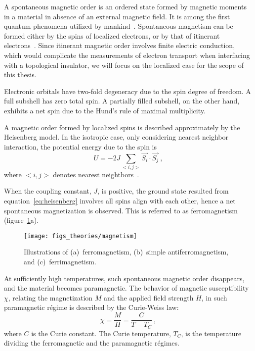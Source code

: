 A spontaneous magnetic order is an ordered state formed by magnetic moments in a material in absence of an external magnetic field. It is among the first quantum phenomena utilized by mankind~\cite{mag_history}. Spontaneous magnetism can be formed either by the spins of localized electrons, or by that of itinerant electrons~\cite{moriya1984}. Since itinerant magnetic order involves finite electric conduction, which would complicate the measurements of electron transport when interfacing with a topological insulator, we will focus on the localized case for the scope of this thesis.

Electronic orbitals have two-fold degeneracy due to the spin degree of freedom. A full subshell has zero total spin. A partially filled subshell, on the other hand, exhibits a net spin due to the Hund's rule of maximal multiplicity.

A magnetic order formed by localized spins is described approximately by the Heisenberg model. In the isotropic case, only considering nearest neighbor interaction, the potential energy due to the spin is%
\begin{equation}%
    U = -2J \sum_{<i, j>} \vec{S_i} \cdot \vec{S_j}~,\label{eq:heisenberg}%
\end{equation}%
where $<i, j>$ denotes nearest neightbors~\cite{kittel}.

When the coupling constant, $J$, is positive, the ground state resulted from equation~\ref{eq:heisenberg} involves all spins align with each other, hence a net spontaneous magnetization is observed. This is referred to as ferromagnetism (figure~\ref{fig:bg_mag}a). %
\begin{figure}[ht]%
    \centering%
    \texttt{[image: figs\_theories/magnetism]}%
    \caption[Illustrations of ferromagnetism, antiferromagnetism, and ferrimagnetism]{\label{fig:bg_mag}Illustrations of (a)~ferromagnetism, (b)~simple antiferromagnetism, and (c)~ferrimagnetism.}%
\end{figure}%
%
At sufficiently high temperatures, such spontaneous magnetic order disappears, and the material becomes paramagnetic. The behavior of magnetic susceptibility $\chi$, relating the magnetization $M$ and the applied field strength $H$, in such paramagnetic r\'egime is described by the Curie-Weiss law:%
\begin{equation}%
    \chi = \frac{M}{H} = \frac{C}{T - T_C}~,\label{eq:curie_weiss}%
\end{equation}%
where $C$ is the Curie constant. The Curie temperature, $T_C$, is the temperature dividing the ferromagnetic and the paramagnetic r\'egimes.

